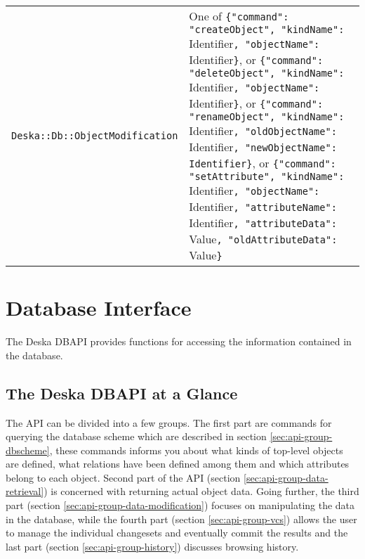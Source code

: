 \documentclass{article}
\begin{document}
\begin{longtable}{ p{60mm} p{90mm} }
    {\tt Deska::Db::ObjectModification} &
        One of \newline
        {\tt \{"command": "createObject", "kindName": }Identifier{\tt, "objectName": }Identifier{\tt \}}, \newline
        or \newline
        {\tt \{"command": "deleteObject", "kindName": }Identifier{\tt, "objectName": }Identifier{\tt \}}, \newline
        or \newline
        {\tt \{"command": "renameObject", "kindName": }Identifier{\tt, "oldObjectName": }Identifier{\tt,
        "newObjectName": }{\tt Identifier\}}, \newline
        or \newline
        {\tt \{"command": "setAttribute", "kindName": }Identifier{\tt, "objectName": }Identifier{\tt, "attributeName":
        }Identifier{\tt, "attributeData": }Value{\tt, "oldAttributeData": }Value{\tt \}} \\

\end{longtable}

\section{Database Interface}

The Deska DBAPI provides functions for accessing the information contained in the database.

\newcommand{\deskaFuncRef}[1]{{\tt {#1}}}

\subsection{The Deska DBAPI at a Glance}

The API can be divided into a few groups.  The first part are commands for querying the database scheme which are
described in section \ref{sec:api-group-dbscheme}, these commands informs you about what kinds of top-level objects are
defined, what relations have been defined among them and which attributes belong to each object.  Second part of the API
(section \ref{sec:api-group-data-retrieval}) is concerned with returning actual object data.  Going further, the third
part (section \ref{sec:api-group-data-modification}) focuses on manipulating the data in the database, while the fourth
part (section \ref{sec:api-group-vcs}) allows the user to manage the individual changesets and eventually commit the
results and the last part (section \ref{sec:api-group-history}) discusses browsing history.
\end{document}
